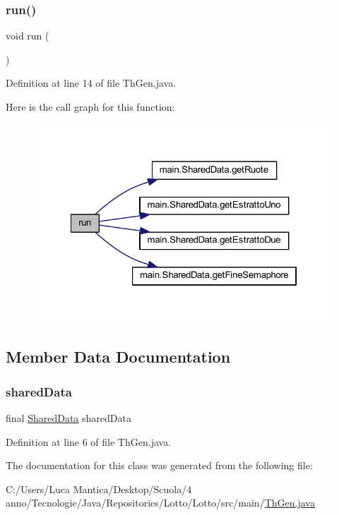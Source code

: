 \subsubsection{\texorpdfstring{run()}{run()}}
{\footnotesize\ttfamily void run (\begin{DoxyParamCaption}{ }\end{DoxyParamCaption})}



Definition at line 14 of file Th\+Gen.\+java.

Here is the call graph for this function\+:
\nopagebreak
\begin{figure}[H]
\begin{center}
\leavevmode
\includegraphics[width=322pt]{classmain_1_1_th_gen_a13a43e6d814de94978c515cb084873b1_cgraph}
\end{center}
\end{figure}


\subsection{Member Data Documentation}
\mbox{\label{classmain_1_1_th_gen_ac5f1128ef8d0ba91a8214e03732e2662}} 
\subsubsection{\texorpdfstring{shared\+Data}{sharedData}}
{\footnotesize\ttfamily final \mbox{\hyperlink{classmain_1_1_shared_data}{Shared\+Data}} shared\+Data\hspace{0.3cm}{\ttfamily [private]}}



Definition at line 6 of file Th\+Gen.\+java.



The documentation for this class was generated from the following file\+:\begin{DoxyCompactItemize}
\item 
C\+:/\+Users/\+Luca Mantica/\+Desktop/\+Scuola/4 anno/\+Tecnologie/\+Java/\+Repositories/\+Lotto/\+Lotto/src/main/\mbox{\hyperlink{_th_gen_8java}{Th\+Gen.\+java}}\end{DoxyCompactItemize}
